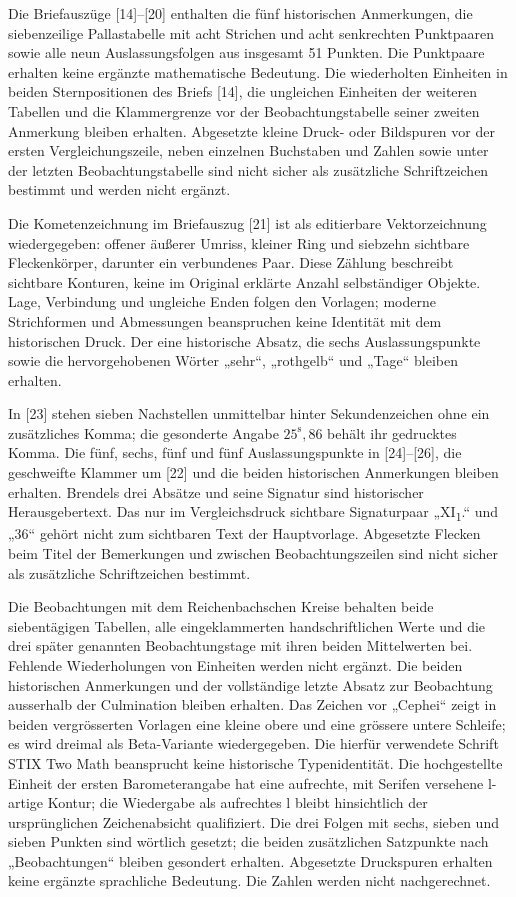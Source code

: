 Die Briefauszüge [14]–[20] enthalten die fünf historischen Anmerkungen, die siebenzeilige Pallastabelle mit acht Strichen und acht senkrechten Punktpaaren sowie alle neun Auslassungsfolgen aus insgesamt 51 Punkten. Die Punktpaare erhalten keine ergänzte mathematische Bedeutung. Die wiederholten Einheiten in beiden Sternpositionen des Briefs [14], die ungleichen Einheiten der weiteren Tabellen und die Klammergrenze vor der Beobachtungstabelle seiner zweiten Anmerkung bleiben erhalten. Abgesetzte kleine Druck- oder Bildspuren vor der ersten Vergleichungszeile, neben einzelnen Buchstaben und Zahlen sowie unter der letzten Beobachtungstabelle sind nicht sicher als zusätzliche Schriftzeichen bestimmt und werden nicht ergänzt.

Die Kometenzeichnung im Briefauszug [21] ist als editierbare Vektorzeichnung wiedergegeben: offener äußerer Umriss, kleiner Ring und siebzehn sichtbare Fleckenkörper, darunter ein verbundenes Paar. Diese Zählung beschreibt sichtbare Konturen, keine im Original erklärte Anzahl selbständiger Objekte. Lage, Verbindung und ungleiche Enden folgen den Vorlagen; moderne Strichformen und Abmessungen beanspruchen keine Identität mit dem historischen Druck. Der eine historische Absatz, die sechs Auslassungspunkte sowie die hervorgehobenen Wörter „sehr“, „rothgelb“ und „Tage“ bleiben erhalten.

In [23] stehen sieben Nachstellen unmittelbar hinter Sekundenzeichen ohne ein zusätzliches Komma; die gesonderte Angabe $25^{\mathrm s}{,}86$ behält ihr gedrucktes Komma. Die fünf, sechs, fünf und fünf Auslassungspunkte in [24]–[26], die geschweifte Klammer um [22] und die beiden historischen Anmerkungen bleiben erhalten. Brendels drei Absätze und seine Signatur sind historischer Herausgebertext. Das nur im Vergleichsdruck sichtbare Signaturpaar „XI\textsubscript{1}.“ und „36“ gehört nicht zum sichtbaren Text der Hauptvorlage. Abgesetzte Flecken beim Titel der Bemerkungen und zwischen Beobachtungszeilen sind nicht sicher als zusätzliche Schriftzeichen bestimmt.

Die Beobachtungen mit dem Reichenbachschen Kreise behalten beide siebentägigen Tabellen, alle eingeklammerten handschriftlichen Werte und die drei später genannten Beobachtungstage mit ihren beiden Mittelwerten bei. Fehlende Wiederholungen von Einheiten werden nicht ergänzt. Die beiden historischen Anmerkungen und der vollständige letzte Absatz zur Beobachtung ausserhalb der Culmination bleiben erhalten. Das Zeichen vor „Cephei“ zeigt in beiden vergrösserten Vorlagen eine kleine obere und eine grössere untere Schleife; es wird dreimal als Beta-Variante wiedergegeben. Die hierfür verwendete Schrift STIX Two Math beansprucht keine historische Typenidentität. Die hochgestellte Einheit der ersten Barometerangabe hat eine aufrechte, mit Serifen versehene l-artige Kontur; die Wiedergabe als aufrechtes l bleibt hinsichtlich der ursprünglichen Zeichenabsicht qualifiziert. Die drei Folgen mit sechs, sieben und sieben Punkten sind wörtlich gesetzt; die beiden zusätzlichen Satzpunkte nach „Beobachtungen“ bleiben gesondert erhalten. Abgesetzte Druckspuren erhalten keine ergänzte sprachliche Bedeutung. Die Zahlen werden nicht nachgerechnet.


